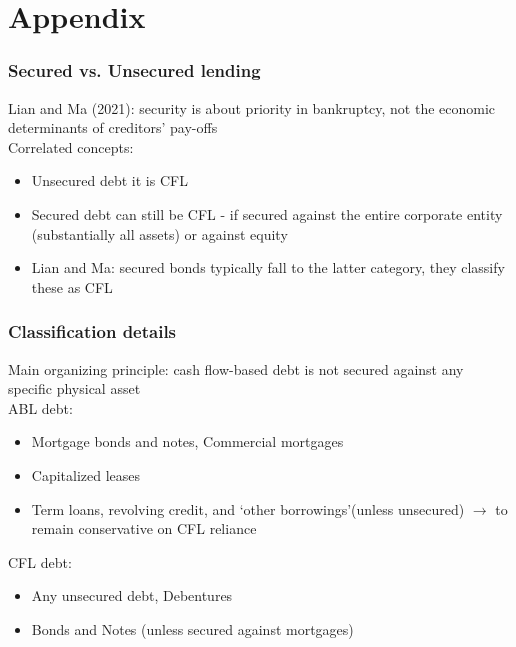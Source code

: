 \documentclass[notes]{beamer}
\begin{document}
\section{Appendix}


\begin{frame}[label=secUnsec] \frametitle{Secured vs. Unsecured lending}
Lian and Ma (2021): security is about priority in bankruptcy, not the economic determinants of creditors' pay-offs \vspace{3mm} \\
Correlated concepts:
\begin{itemize}
\item Unsecured debt it is CFL
\item Secured debt can still be CFL - if secured against the entire corporate entity (substantially all assets) or against equity
\item Lian and Ma: secured bonds typically fall to the latter category, they classify these as CFL 
\end{itemize}

\begin{center}
\hyperlink{intro1}{}
\end{center}

\end{frame}

\begin{frame}[label=Classification] \frametitle{Classification details}
Main organizing principle: cash flow-based debt is not secured against any specific physical asset \vspace{4mm} \\
ABL debt: 
\begin{itemize}
 \setlength\itemsep{0em}
\item Mortgage bonds and notes, Commercial mortgages
\item Capitalized leases
\item Term loans, revolving credit, and `other borrowings'(unless unsecured) $\rightarrow$ to remain conservative on CFL reliance
\end{itemize}

CFL debt: 
\begin{itemize}
 \setlength\itemsep{0em}
\item Any unsecured debt, Debentures
\item Bonds and Notes (unless secured against mortgages)
\end{itemize}
\begin{center}
\hyperlink{slide2}{}
\end{center}
\end{frame}
\end{document}
